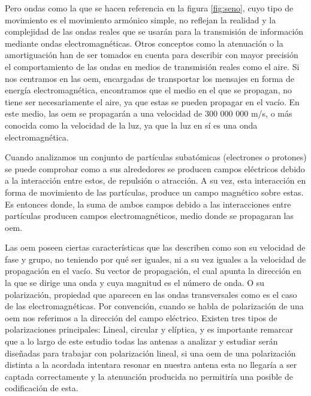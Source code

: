 \par Pero ondas como la que se hacen referencia en la figura \ref{fig:seno}, cuyo tipo de movimiento es el movimiento armónico simple, no reflejan la realidad y la complejidad de las ondas reales que se usarán para la transmisión de información mediante ondas electromagnéticas. Otros conceptos como la atenuación o la amortiguación han de ser tomados en cuenta para describir con mayor precisión el comportamiento de las ondas en medios de transmisión reales como el aire. Si nos centramos en las \gls{oem}, encargadas de transportar los mensajes en forma de energía electromagnética, encontramos que el medio en el que se propagan, no tiene  ser necesariamente el aire, ya que estas se pueden propagar en el vacío. En este medio, las \gls{oem} se propagarán a una velocidad de 300 000 000 m/s, o más conocida como la velocidad de la luz, ya que la luz en sí es una onda electromagnética. 
\\
\par Cuando analizamos un conjunto de partículas subatómicas (electrones o protones) se puede comprobar como a sus alrededores se producen campos eléctricos debido a la interacción entre estos, de repulsión o atracción. A su vez, esta interacción en forma de movimiento de las partículas, produce un campo magnético sobre estas. Es entonces donde, la suma de ambos campos debido a las interacciones entre partículas producen campos electromagnéticos, medio donde se propagaran las \gls{oem}.
\\
\par Las \gls{oem} poseen ciertas características que las describen como son su velocidad de fase y grupo, no teniendo por qué  ser iguales, ni a su vez iguales a la velocidad de propagación en el vacío. Su vector de propagación, el cual apunta la dirección en la que se dirige una onda y cuya magnitud es el número de onda. O su polarización, propiedad que aparecen en las ondas transversales como es el caso de las electromagnéticas. Por convención, cuando se habla de polarización de una \gls{oem} nos referimos a la dirección del campo eléctrico. Existen tres tipos de polarizaciones principales: Lineal, circular y elíptica, y es importante remarcar que a lo largo de este estudio todas las antenas a analizar y estudiar serán diseñadas para trabajar con polarización lineal, si una \gls{oem} de una polarización distinta a la acordada intentara resonar en nuestra antena esta no llegaría a ser captada correctamente y la atenuación producida no permitiría una posible de codificación de esta.


